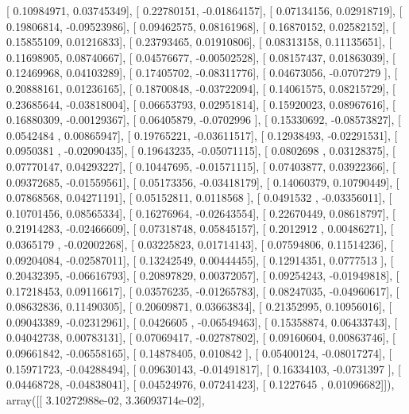 \documentclass{article}
\begin{document}
       [ 0.10984971,  0.03745349],
       [ 0.22780151, -0.01864157],
       [ 0.07134156,  0.02918719],
       [ 0.19806814, -0.09523986],
       [ 0.09462575,  0.08161968],
       [ 0.16870152,  0.02582152],
       [ 0.15855109,  0.01216833],
       [ 0.23793465,  0.01910806],
       [ 0.08313158,  0.11135651],
       [ 0.11698905,  0.08740667],
       [ 0.04576677, -0.00502528],
       [ 0.08157437,  0.01863039],
       [ 0.12469968,  0.04103289],
       [ 0.17405702, -0.08311776],
       [ 0.04673056, -0.0707279 ],
       [ 0.20888161,  0.01236165],
       [ 0.18700848, -0.03722094],
       [ 0.14061575,  0.08215729],
       [ 0.23685644, -0.03818004],
       [ 0.06653793,  0.02951814],
       [ 0.15920023,  0.08967616],
       [ 0.16880309, -0.00129367],
       [ 0.06405879, -0.0702996 ],
       [ 0.15330692, -0.08573827],
       [ 0.0542484 ,  0.00865947],
       [ 0.19765221, -0.03611517],
       [ 0.12938493, -0.02291531],
       [ 0.0950381 , -0.02090435],
       [ 0.19643235, -0.05071115],
       [ 0.0802698 ,  0.03128375],
       [ 0.07770147,  0.04293227],
       [ 0.10447695, -0.01571115],
       [ 0.07403877,  0.03922366],
       [ 0.09372685, -0.01559561],
       [ 0.05173356, -0.03418179],
       [ 0.14060379,  0.10790449],
       [ 0.07868568,  0.04271191],
       [ 0.05152811,  0.0118568 ],
       [ 0.0491532 , -0.03356011],
       [ 0.10701456,  0.08565334],
       [ 0.16276964, -0.02643554],
       [ 0.22670449,  0.08618797],
       [ 0.21914283, -0.02466609],
       [ 0.07318748,  0.05845157],
       [ 0.2012912 ,  0.00486271],
       [ 0.0365179 , -0.02002268],
       [ 0.03225823,  0.01714143],
       [ 0.07594806,  0.11514236],
       [ 0.09204084, -0.02587011],
       [ 0.13242549,  0.00444455],
       [ 0.12914351,  0.0777513 ],
       [ 0.20432395, -0.06616793],
       [ 0.20897829,  0.00372057],
       [ 0.09254243, -0.01949818],
       [ 0.17218453,  0.09116617],
       [ 0.03576235, -0.01265783],
       [ 0.08247035, -0.04960617],
       [ 0.08632836,  0.11490305],
       [ 0.20609871,  0.03663834],
       [ 0.21352995,  0.10956016],
       [ 0.09043389, -0.02312961],
       [ 0.0426605 , -0.06549463],
       [ 0.15358874,  0.06433743],
       [ 0.04042738,  0.00783131],
       [ 0.07069417, -0.02787802],
       [ 0.09160604,  0.00863746],
       [ 0.09661842, -0.06558165],
       [ 0.14878405,  0.010842  ],
       [ 0.05400124, -0.08017274],
       [ 0.15971723, -0.04288494],
       [ 0.09630143, -0.01491817],
       [ 0.16334103, -0.0731397 ],
       [ 0.04468728, -0.04838041],
       [ 0.04524976,  0.07241423],
       [ 0.1227645 ,  0.01096682]]), array([[  3.10272988e-02,   3.36093714e-02],
\end{document}
